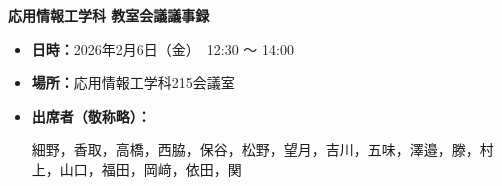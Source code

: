\documentclass[10.5pt,a4paper]{jsarticle}
\begin{document}
\begin{center}
\fontsize{12pt}{12pt}\bf{応用情報工学科 教室会議議事録}
\end{center}
\vspace{1\baselineskip}

%

\begin{itemize}[labelsep=0.5zw, leftmargin=1zw, itemindent=0pt, labelwidth=0pt, listparindent=0pt, parsep=0pt]
    \item[①] \textbf{日時：}2026年2月6日（金）　12:30 ～ 14:00
    \item[②] \textbf{場所：}応用情報工学科215会議室
    \item[③] \textbf{出席者（敬称略）：}%
    \parbox[t]{0.8\textwidth}{
        細野，香取，高橋，西脇，保谷，松野，望月，吉川，五味，澤邉，滕，村上，山口，福田，岡﨑，依田，関
    }
\end{itemize}


\vspace{0.1\baselineskip}
\end{document}
